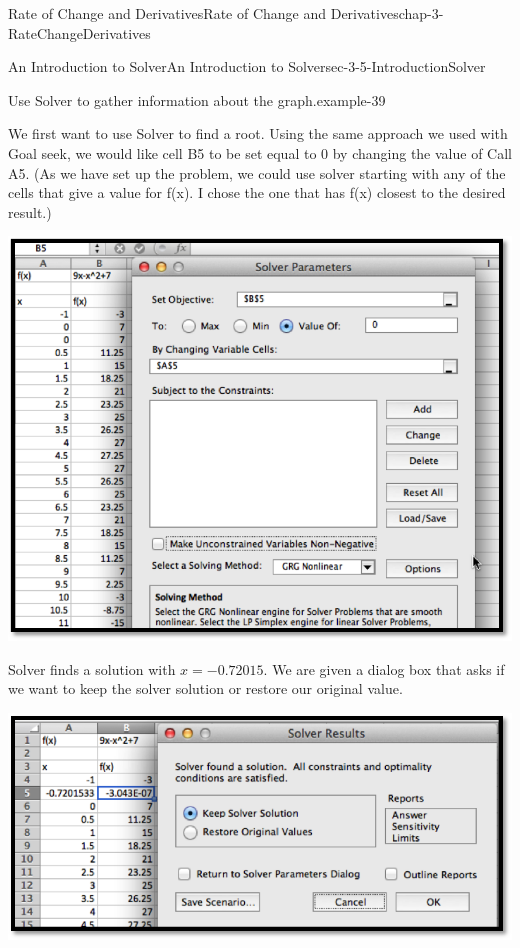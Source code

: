 \documentclass[oneside,10pt,]{book}
\numberwithin{equation}{section}
\begin{document}
\begin{chapterptx}{Rate of Change and Derivatives}{}{Rate of Change and Derivatives}{}{}{chap-3-RateChangeDerivatives}
\begin{sectionptx}{An Introduction to Solver}{}{An Introduction to Solver}{}{}{sec-3-5-IntroductionSolver}
\begin{example}{Use Solver to gather information about the graph.}{example-39}
\par
\hypertarget{p-1333}{}%
We first want to use Solver to find a root.  Using the same approach we used with Goal seek, we would like cell B5 to be set equal to 0 by changing the value of Call A5.  (As we have set up the problem, we could use solver starting with any of the cells that give a value for f(x).  I chose the one that has f(x) closest to the desired result.)%
\begin{sidebyside}{1}{0.15}{0.15}{0}%
\begin{sbspanel}{0.7}%
\includegraphics[width=1\linewidth]{images/sec3-5-3.png}
\end{sbspanel}%
\end{sidebyside}%
\par
\hypertarget{p-1334}{}%
Solver finds a solution with \(x=-0.72015\).  We are given a dialog box that asks if we want to keep the solver solution or restore our original value.%
\begin{sidebyside}{1}{0.15}{0.15}{0}%
\begin{sbspanel}{0.7}%
\includegraphics[width=1\linewidth]{images/sec3-5-4.png}

\end{sbspanel}
\end{sidebyside}
\end{example}
\end{sectionptx}
\end{chapterptx}
\end{document}
